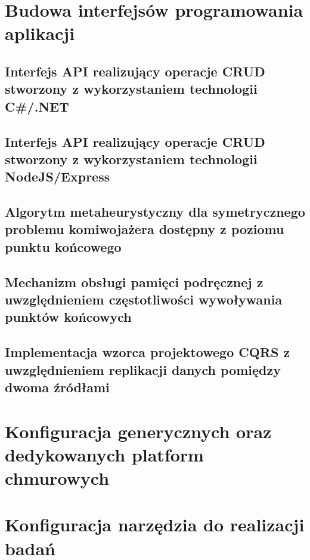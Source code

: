 \section{Budowa interfejsów programowania aplikacji}
\subsection*{Interfejs API realizujący operacje CRUD stworzony z wykorzystaniem technologii C\#/.NET}
\subsection*{Interfejs API realizujący operacje CRUD stworzony z wykorzystaniem technologii NodeJS/Express}
\subsection*{Algorytm metaheurystyczny dla symetrycznego problemu komiwojażera dostępny z poziomu punktu końcowego}
\subsection*{Mechanizm obsługi pamięci podręcznej z uwzględnieniem częstotliwości wywoływania punktów końcowych}
\subsection*{Implementacja wzorca projektowego CQRS z uwzględnieniem replikacji danych pomiędzy dwoma źródłami}
\section{Konfiguracja generycznych oraz dedykowanych platform chmurowych}
\section{Konfiguracja narzędzia do realizacji badań}


